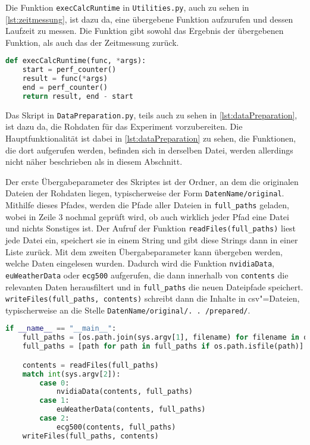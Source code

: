 Die Funktion \lstinline|execCalcRuntime| in \texttt{Utilities.py}, auch zu sehen in \autoref{lst:zeitmessung}, ist dazu da, eine übergebene Funktion aufzurufen und dessen Laufzeit zu messen. Die Funktion gibt sowohl das Ergebnis der übergebenen Funktion, als auch das der Zeitmessung zurück.
\begin{lstlisting}[caption=Funktion zur Zeitmessung, language=Python, label=lst:zeitmessung, style=Python]
def execCalcRuntime(func, *args):
    start = perf_counter()
    result = func(*args)
    end = perf_counter()
    return result, end - start
\end{lstlisting}

Das Skript in \texttt{DataPreparation.py}, teils auch zu sehen in \autoref{lst:dataPreparation}, ist dazu da, die Rohdaten für das Experiment vorzubereiten. Die Hauptfunktionalität ist dabei in \autoref{lst:dataPreparation} zu sehen, die Funktionen, die dort aufgerufen werden, befinden sich in derselben Datei, werden allerdings nicht näher beschrieben als in diesem Abschnitt.

Der erste Übergabeparameter des Skriptes ist der Ordner, an dem die originalen Dateien der Rohdaten liegen, typischerweise der Form \texttt{DatenName/original}. Mithilfe dieses Pfades, werden die Pfade aller Dateien in \lstinline|full_paths| geladen, wobei in Zeile 3 nochmal geprüft wird, ob auch wirklich jeder Pfad eine Datei und nichts Sonstiges ist. Der Aufruf der Funktion \lstinline|readFiles(full_paths)| liest jede Datei ein, speichert sie in einem String und gibt diese Strings dann in einer Liste zurück. Mit dem zweiten Übergabeparameter kann übergeben werden, welche Daten eingelesen wurden. Dadurch wird die Funktion \lstinline|nvidiaData|, \lstinline|euWeatherData| oder \lstinline|ecg500| aufgerufen, die dann innerhalb von \lstinline|contents| die relevanten Daten herausfiltert und in \lstinline|full_paths| die neuen Dateipfade speichert. \lstinline|writeFiles(full_paths, contents)| schreibt dann die Inhalte in csv"=Dateien, typischerweise an die Stelle \texttt{DatenName/original/.\,.\,/prepared/}.
\begin{lstlisting}[caption=Vorverarbeitung der Daten, language=Python, label=lst:dataPreparation, style=Python]
if __name__ == "__main__":
    full_paths = [os.path.join(sys.argv[1], filename) for filename in os.listdir(sys.argv[1])]
    full_paths = [path for path in full_paths if os.path.isfile(path)]

    contents = readFiles(full_paths)
    match int(sys.argv[2]):
        case 0:
            nvidiaData(contents, full_paths)
        case 1:
            euWeatherData(contents, full_paths)
        case 2:
            ecg500(contents, full_paths)
    writeFiles(full_paths, contents)
\end{lstlisting}

